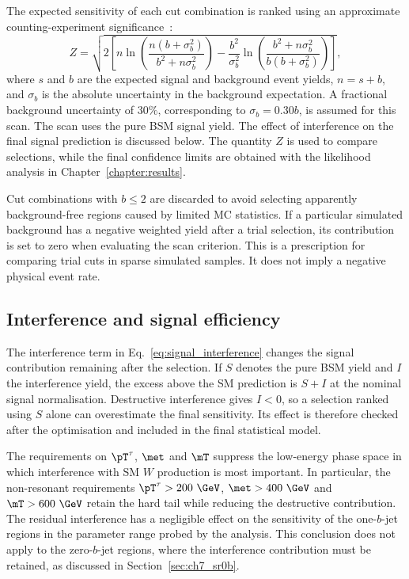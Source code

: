 The expected sensitivity of each cut combination is ranked using an approximate counting-experiment significance~\cite{ATL-PHYS-PUB-2020-025}:
\begin{equation}
    Z = \sqrt{2\left[n\ln\!\left(\frac{n(b+\sigma_b^2)}{b^2+n\sigma_b^2}\right)-\frac{b^2}{\sigma_b^2}\ln\!\left(\frac{b^2+n\sigma_b^2}{b(b+\sigma_b^2)}\right)\right]},
    \label{eq:ch7_optimisation_significance}
\end{equation}
where $s$ and $b$ are the expected signal and background event yields, $n=s+b$, and $\sigma_b$ is the absolute uncertainty in the background expectation.
A fractional background uncertainty of $30\%$, corresponding to $\sigma_b=0.30b$, is assumed for this scan.
The scan uses the pure BSM signal yield.
The effect of interference on the final signal prediction is discussed below.
The quantity $Z$ is used to compare selections, while the final confidence limits are obtained with the likelihood analysis in Chapter~\ref{chapter:results}.

Cut combinations with $b\leq2$ are discarded to avoid selecting apparently background-free regions caused by limited MC statistics.
If a particular simulated background has a negative weighted yield after a trial selection, its contribution is set to zero when evaluating the scan criterion.
This is a prescription for comparing trial cuts in sparse simulated samples.
It does not imply a negative physical event rate.

\subsection{Interference and signal efficiency}
\label{subsec:ch7_efficiency}

The interference term in Eq.~\ref{eq:signal_interference} changes the signal contribution remaining after the selection.
If $S$ denotes the pure BSM yield and $I$ the interference yield, the excess above the SM prediction is $S+I$ at the nominal signal normalisation.
Destructive interference gives $I<0$, so a selection ranked using $S$ alone can overestimate the final sensitivity.
Its effect is therefore checked after the optimisation and included in the final statistical model.

The requirements on $\pT^\tau$, $\met$ and $\mT$ suppress the low-energy phase space in which interference with SM $W$ production is most important.
In particular, the non-resonant requirements $\pT^\tau>200~\GeV$, $\met>400~\GeV$ and $\mT>600~\GeV$ retain the hard tail while reducing the destructive contribution.
The residual interference has a negligible effect on the sensitivity of the one-$b$-jet regions in the parameter range probed by the analysis.
This conclusion does not apply to the zero-$b$-jet regions, where the interference contribution must be retained, as discussed in Section~\ref{sec:ch7_sr0b}.

